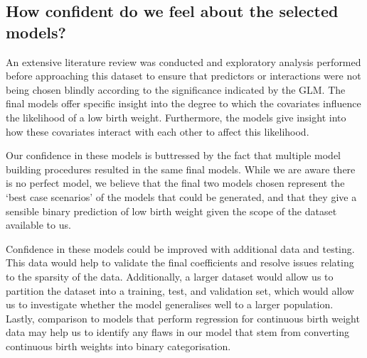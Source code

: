 \subsection*{How confident do we feel about the selected models?}
An extensive literature review was conducted and exploratory analysis performed before approaching this dataset to ensure that predictors or interactions were not being chosen blindly according to the significance indicated by the GLM. The final models offer specific insight into the degree to which the covariates influence the likelihood of a low birth weight. Furthermore, the models give insight into how these covariates interact with each other to affect this likelihood.

Our confidence in these models is buttressed by the fact that multiple model building procedures resulted in the same final models. While we are aware there is no perfect model, we believe that the final two models chosen represent the ‘best case scenarios’ of the models that could be generated, and that they give a sensible binary prediction of low birth weight given the scope of the dataset available to us.

Confidence in these models could be improved with additional data and testing. This data would help to validate the final coefficients and resolve issues relating to the sparsity of the data. Additionally, a larger dataset would allow us to partition the dataset into a training, test, and validation set, which would allow us to investigate whether the model generalises well to a larger population. Lastly, comparison to models that perform regression for continuous birth weight data may help us to identify any flaws in our model that stem from converting continuous birth weights into binary categorisation.